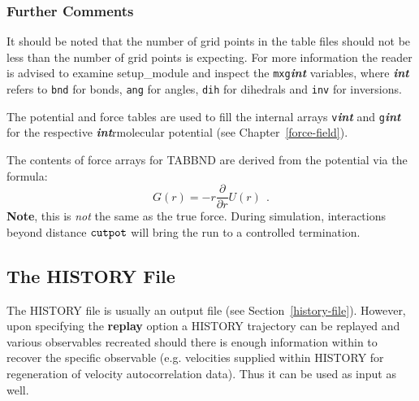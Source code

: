 \subsubsection{Further Comments}

It should be noted that the number of grid points in the table files
should not be less than the number of grid points \D is expecting.
For more information the reader is advised to examine {\sc setup\_module}
and inspect the {\tt mxg}\textrm{\textit{\textbf{int}}} variables, where
\textrm{\textit{\textbf{int}}} refers to {\tt bnd} for bonds, {\tt ang}
for angles, {\tt dih} for dihedrals and {\tt inv} for inversions.

The potential and force tables are used to fill the internal arrays
{\tt v}\textrm{\textit{\textbf{int}}} and {\tt g}\textrm{\textit{\textbf{int}}}
for the respective \textrm{\textit{\textbf{int}}}rmolecular potential
(see Chapter~\ref{force-field}).

The contents of force arrays for TABBND are derived from the potential
via the formula:
\begin{equation}
G(r)=-r\frac{\partial}{\partial r}U(r)~~.
\end{equation}
{\bf Note}, this is {\em not} the same as the true force.  During simulation,
interactions beyond distance ${\tt cutpot}$ will bring the run to a controlled
termination.

\subsection{The HISTORY File}

The HISTORY file is usually an output file (see Section~\ref{history-file}).
However, upon specifying the {\bf replay} option a HISTORY trajectory can
be replayed and various observables recreated should there is enough
information within to recover the specific observable (e.g. velocities
supplied within HISTORY for regeneration of velocity autocorrelation
data).  Thus it can be used as input as well.
